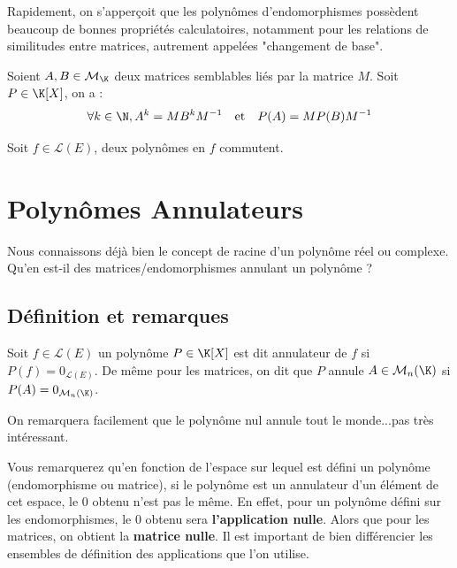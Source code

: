 Rapidement, on s'apperçoit que les polynômes d'endomorphismes possèdent beaucoup de bonnes propriétés calculatoires, 
notamment pour les relations de similitudes entre matrices, autrement appelées "changement de base". 

\begin{prop}
    Soient $A,B\in \mathcal{M}_{\K}$ deux matrices semblables liés par la matrice $M$. Soit $P \in \K[X]$, on a :
        $$ \forall k \in \N, A^k = M B^k M ^{-1} \quad \text{et} \quad  P(A) = M P(B) M^{-1} $$
\end{prop}

\begin{prop}[Commutation]
    Soit $f \in \mathcal{L}(E)$, deux polynômes en $f$ commutent. 
\end{prop}



\section{Polynômes Annulateurs}

Nous connaissons déjà bien le concept de racine d'un polynôme réel ou complexe. 
Qu'en est-il des matrices/endomorphismes annulant un polynôme ?

\subsection{Définition et remarques}

\begin{definition}
    Soit $ f \in \mathcal{L}(E)$ un polynôme $ P \in \K[X]$ est dit annulateur de $f$ si $P(f) = 0_{\mathcal{L}(E)}$. 
    De même pour les matrices, on dit que $P$ annule $A \in \mathcal{M}_n(\K)$ si $P(A) = 0_{\mathcal{M}_n(\K)}$. 
\end{definition}

On remarquera facilement que le polynôme nul annule tout le monde...pas très intéressant. 

\begin{remark}
    Vous remarquerez qu'en fonction de l'espace sur lequel est défini un polynôme (endomorphisme ou matrice), 
    si le polynôme est un annulateur d'un élément de cet espace, le $0$ obtenu n'est pas le même. 
    En effet, pour un polynôme défini sur les endomorphismes, le 0 obtenu sera \textbf{l'application nulle}. 
    Alors que pour les matrices, on obtient la \textbf{matrice nulle}. 
    Il est important de bien différencier les ensembles de définition des applications que l'on utilise. 
\end{remark}

